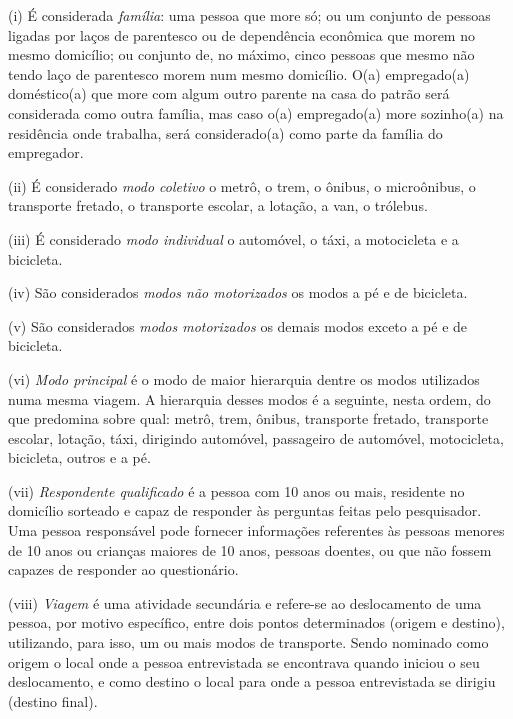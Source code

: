 \begin{compactitem}[]
\item (i) É considerada \emph{família}: uma pessoa que more só; ou um conjunto de pessoas ligadas por laços de parentesco ou de dependência econômica que morem no mesmo domicílio; ou conjunto de, no máximo, cinco pessoas que mesmo não tendo laço de parentesco morem num mesmo domicílio. O(a) empregado(a) doméstico(a) que more com algum outro parente na casa do patrão será considerada como outra família, mas caso o(a) empregado(a) more sozinho(a) na residência onde trabalha, será considerado(a) como parte da família do empregador.

\item (ii) É considerado \emph{modo coletivo} o metrô, o trem, o ônibus, o microônibus, o transporte fretado, o transporte escolar, a lotação, a van, o trólebus.

\item (iii) É considerado \emph{modo individual} o automóvel, o táxi, a motocicleta e a bicicleta.

\item (iv) São considerados \emph{modos não motorizados} os modos a pé e de bicicleta.

\item (v) São considerados \emph{modos motorizados} os demais modos exceto a pé e de bicicleta.

\item (vi) \emph{Modo principal} é o modo de maior hierarquia dentre os modos utilizados numa mesma viagem. A hierarquia desses modos é a seguinte, nesta ordem, do que predomina sobre qual: metrô, trem, ônibus, transporte fretado, transporte escolar, lotação, táxi, dirigindo automóvel, passageiro de automóvel, motocicleta, bicicleta, outros e a pé.

\item (vii) \emph{Respondente qualificado} é a pessoa com 10 anos ou mais, residente no domicílio sorteado e capaz de responder às perguntas feitas pelo pesquisador. Uma pessoa responsável pode fornecer informações referentes às pessoas menores de 10 anos ou crianças maiores de 10 anos, pessoas doentes, ou que não fossem capazes de responder ao questionário.

\item (viii) \emph{Viagem} é uma atividade secundária e refere-se ao deslocamento de uma pessoa, por motivo específico, entre dois pontos determinados (origem e destino), utilizando, para isso, um ou mais modos de transporte. Sendo nominado como origem o local onde a pessoa entrevistada se encontrava quando iniciou o seu deslocamento, e como destino o local para onde a pessoa entrevistada se dirigiu (destino final).


\end{compactitem}

